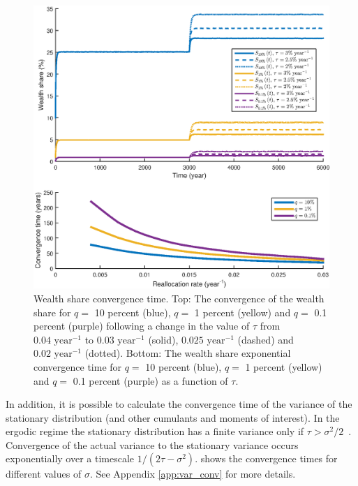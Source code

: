 \begin{figure}[!htb]
\centering
\includegraphics[width=1.0\textwidth] {./chapter_3/figs/convergence.eps}
\caption{Wealth share convergence time. Top: The convergence of the wealth share for $q=$ 10 percent (blue), $q=$ 1 percent (yellow) and $q=$ 0.1 percent (purple) following a change in the value of $\tau$ from $0.04\text{ year}^{-1}$ to $0.03\text{ year}^{-1}$ (solid), $0.025\text{ year}^{-1}$ (dashed) and $0.02\text{ year}^{-1}$ (dotted). Bottom: The wealth share exponential convergence time for $q=$ 10 percent (blue), $q=$ 1 percent (yellow) and $q=$ 0.1 percent (purple) as a function of $\tau$.}
\end{figure}

In addition, it is possible to calculate the convergence time of the variance of the stationary distribution (and other cumulants and moments of interest). In the ergodic regime the stationary distribution has a finite variance only if $\tau > \sigma^2/2$~\cite{LiuSerota2016}. Convergence of the actual variance to the stationary variance occurs exponentially over a timescale $1/(2\tau - \sigma^2)$.  shows the convergence times for different values of $\sigma$. See Appendix \ref{app:var_conv} for more details.

